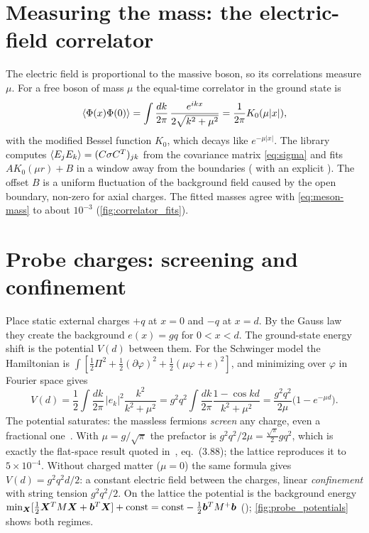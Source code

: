 \section{Measuring the mass: the electric-field correlator}
The electric field is proportional to the massive boson, so its correlations measure $\mu$. For a free boson of
mass $\mu$ the equal-time correlator in the ground state is
\begin{equation}
  \langle \Phi(x)\Phi(0)\rangle = \int\frac{dk}{2\pi}\,\frac{e^{ikx}}{2\sqrt{k^2+\mu^2}} = \frac{1}{2\pi}K_0(\mu|x|),
\end{equation}
with the modified Bessel function $K_0$, which decays like $e^{-\mu|x|}$. The library computes
$\langle E_jE_k\rangle = (C\sigma C^T)_{jk}$ from the covariance matrix \eqref{eq:sigma} and fits $A K_0(\mu r) + B$
in a window away from the boundaries ( with an explicit
). The offset $B$ is a uniform fluctuation of the background field caused by the open boundary,
non-zero for axial charges. The fitted masses agree with \eqref{eq:meson-mass} to about $10^{-3}$
(\cref{fig:correlator_fits}).


\section{Probe charges: screening and confinement}\label{sec:probes}
Place static external charges $+q$ at $x=0$ and $-q$ at $x = d$. By the Gauss law they create the background
$e(x) = gq$ for $0<x<d$. The ground-state energy shift is the potential $V(d)$ between them. For the Schwinger
model the Hamiltonian is $\int[\frac12\Pi^2 + \frac12(\partial\varphi)^2 + \frac12(\mu\varphi + e)^2]$, and
minimizing over $\varphi$ in Fourier space gives
\begin{equation}
  V(d) = \frac12\int\frac{dk}{2\pi}\,|e_k|^2\frac{k^2}{k^2+\mu^2}
       = g^2q^2\int\frac{dk}{2\pi}\frac{1 - \cos kd}{k^2+\mu^2}
       = \frac{g^2q^2}{2\mu}\bigl(1 - e^{-\mu d}\bigr).
\end{equation}
The potential saturates: the massless fermions \emph{screen} any charge, even a fractional one~\cite{CJS1975}.
With $\mu = g/\sqrt\pi$ the prefactor is $g^2q^2/2\mu = \frac{\sqrt\pi}{2}gq^2$, which is exactly the flat-space
result quoted in~\cite{BharadwajIsenKang2026}, eq.~(3.88); the lattice reproduces it to $5\times10^{-4}$.
Without charged matter ($\mu = 0$) the same formula gives $V(d) = g^2q^2d/2$: a constant electric field between
the charges, linear \emph{confinement} with string tension $g^2q^2/2$. On the lattice the potential is the
background energy $\min_{\bm{X}}[\frac12\bm{X}^TM\bm{X} + \bm{b}^T\bm{X}] + \text{const} = \text{const} - \frac12\bm{b}^TM^+\bm{b}$
(); \cref{fig:probe_potentials} shows both regimes.

